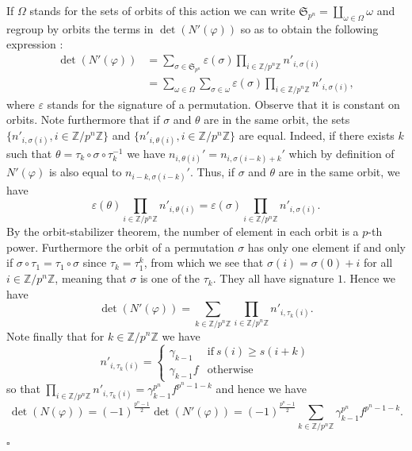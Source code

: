 \documentclass{amsart}
\newenvironment{demo}{{\flushleft \bf Proof~:}}{\hfill $\square$ \vspace{5mm}}
\theoremstyle{definition}
\theoremstyle{remark}
\begin{document}
\begin{demo}
If $\Omega$ stands for the sets of orbits of this action we can write ${{\mathfrak S}}_{p^n} = \displaystyle\coprod_{\omega \in \Omega} \omega$ and regroup by orbits the terms in $\det(N'(\varphi))$ so as to obtain the following expression : 
\begin{equation*} 
\begin{split}
\det(N'(\varphi))  & = \displaystyle\sum_{\sigma \in {{\mathfrak S}}_{p^n} } \varepsilon(\sigma) \displaystyle\prod_{i \in  {\mathbb{Z}} / p^n {\mathbb{Z}}} n'_{i, \sigma(i)} \\
& = \displaystyle\sum_{\omega \in \Omega} \displaystyle\sum_{ \sigma \in \omega} \varepsilon(\sigma) \displaystyle\prod_{i \in {\mathbb{Z}} / p^n {\mathbb{Z}}} n'_{i,\sigma(i)} ,
\end{split}
\end{equation*} where $\varepsilon$ stands for the signature of a permutation. Observe that it is constant on orbits. Note furthermore that if $\sigma$ and $\theta$ are in the same orbit, the sets $\{ n'_{i,\sigma(i)}, i \in {\mathbb{Z}} / p^n {\mathbb{Z}} \}$ and $\{ n'_{i, \theta(i)}, i \in {\mathbb{Z}} / p^n {\mathbb{Z}} \}$ are equal. Indeed, if there exists $k$ such that $\theta = \tau_k \circ \sigma \circ \tau_k^{-1}$ we have $n_{i,\theta(i)}'= n_{i,\sigma(i-k) +k}'$ which by definition of $N'(\varphi)$ is also equal to $n_{i-k,\sigma(i-k)}'$. Thus, if $\sigma$ and $\theta$ are in the same orbit, we have \[ \varepsilon(\theta) \displaystyle\prod_{i \in {\mathbb{Z}} / p^n {\mathbb{Z}}} n'_{i,\theta(i)} = \varepsilon(\sigma) \displaystyle\prod_{i \in {\mathbb{Z}} / p^n {\mathbb{Z}}} n'_{i, \sigma(i)}. \]
By the orbit-stabilizer theorem, the number of element in each orbit is a $p$-th power. Furthermore the orbit of a permutation $\sigma$ has only one element if and only if $\sigma \circ \tau_1 = \tau_1 \circ \sigma$ since $\tau_k = \tau_1^k$, from which we see that $\sigma(i) = \sigma(0) + i$ for all $i \in {\mathbb{Z}}/ p^n {\mathbb{Z}}$, meaning that $\sigma$ is one of the $\tau_k$. They all have signature $1$.
Hence we have \[\det(N'(\varphi)) = \displaystyle\sum_{k \in {\mathbb{Z}}/ p^n {\mathbb{Z}}} \displaystyle\prod_{i \in {\mathbb{Z}} / p^n {\mathbb{Z}}} n'_{i, \tau_k(i)}.\]
Note finally that for $k \in {\mathbb{Z}}/ p^n {\mathbb{Z}}$ we have \[ n'_{i, \tau_k(i)} = \begin{cases}

\gamma_{k-1} & \mbox{if} \ s(i) \geq s(i+k) \\
\gamma_{k-1} f & \mbox{otherwise} 
\end{cases} \] so that $\displaystyle\prod_{i \in {\mathbb{Z}} / p^n {\mathbb{Z}}} n'_{i, \tau_k(i)} = \gamma_{k-1}^{p^n} f^{p^n-1-k}$ and hence we have \[\det(N(\varphi)) = (-1)^{\frac{p^n-1}{2}} \det(N'(\varphi)) = (-1)^{\frac{p^n-1}{2}} \displaystyle\sum_{k \in {\mathbb{Z}}/ p^n {\mathbb{Z}}}\gamma_{k-1}^{p^n} f^{p^n-1-k}. \]


\end{demo}
\end{document}
